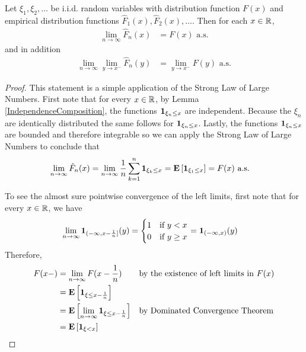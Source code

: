 \begin{lem}\label{PointwiseConvergenceOfEmpiricalDistribution}Let $\xi_1, \xi_2, \dots$ be i.i.d. random variables with
  distribution function $F(x)$ and empirical distribution functions
  $\hat{F}_1(x), \hat{F}_2(x), \dots$.  Then for each $x \in \mathbb{R}$,
\begin{align*}
\lim_{n \to \infty} \hat{F}_n(x) &= F(x) \text{ a.s.}
\end{align*}
and in addition
\begin{align*}
\lim_{n \to \infty} \lim_{y \to x^-}\hat{F}_n(y) &= \lim_{y \to x^-} F(y) \text{ a.s.}
\end{align*}
\end{lem}
\begin{proof}
This statement is a simple application of the Strong Law of Large
Numbers.  First note that for every $x \in \mathbb{R}$, by Lemma
\ref{IndependenceComposition}, the functions 
$\textbf{1}_{\xi_n \leq x}$ are independent.  Because the $\xi_n$
are identically distributed the same follows for
$\textbf{1}_{\xi_n \leq x}$.  Lastly, the functions
$\textbf{1}_{\xi_n \leq x}$ are bounded and therefore integrable
so we can apply the Strong Law of Large Numbers to conclude that 
\begin{align*}
\lim_{n \to \infty} \hat{F}_n(x) &= \lim_{n \to \infty} \frac{1}{n} \sum_{k=1}^n \textbf{1}_{\xi_k
  \leq x} = \textbf{E}\left[\textbf{1}_{\xi_1 \leq x}\right] = F(x) \text{ a.s.}
\end{align*}

To see the almost sure pointwise convergence of the left limits, first
note that for every $x \in \mathbb{R}$, we have 
\begin{align*}
\lim_{n\to \infty} \textbf{1}_{(-\infty, x-\frac{1}{n}]}(y) &= \begin{cases}
1 & \text{if $y < x$} \\
0 & \text{if $y \geq x$}
\end{cases} = \textbf{1}_{(-\infty, x)}(y)
\end{align*}
Therefore, 
\begin{align*}
F(x-) &= \lim_{n \to \infty} F(x - \frac{1}{n}) & &\text{by the existence of left limits in $F(x)$}\\
&= 
\textbf{E}\left[\textbf{1}_{\xi \leq x-\frac{1}{n}}\right] \\
&= \textbf{E}\left[\lim_{n \to \infty}\textbf{1}_{\xi \leq
    x-\frac{1}{n}}\right] & & \text{by Dominated Convergence Theorem} \\
&= \textbf{E}\left[\textbf{1}_{\xi < x}\right]
\end{align*}


\end{proof}
